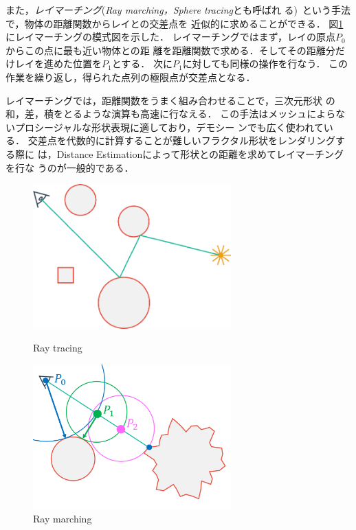 また，\emph{レイマーチング}({\it Ray marching，Sphere tracing}とも呼ばれ
る)~\cite{hart1996sphere}という手法で，物体の距離関数からレイとの交差点を
近似的に求めることができる．
図\ref{fig:raymarch}にレイマーチングの模式図を示した．
レイマーチングではまず，レイの原点$P_0$からこの点に最も近い物体との距
離を距離関数で求める．そしてその距離分だけレイを進めた位置を$P_1$とする．
次に$P_1$に対しても同様の操作を行なう．
この作業を繰り返し，得られた点列の極限点が交差点となる．

レイマーチングでは，距離関数をうまく組み合わせることで，三次元形状
の和，差，積をとるような演算も高速に行なえる．
この手法はメッシュによらないプロシージャルな形状表現に適しており，デモシー
ンでも広く使われている．
交差点を代数的に計算することが難しいフラクタル形状をレンダリングする際に
は，Distance Estimationによって形状との距離を求めてレイマーチングを行な
うのが一般的である．

 \begin{figure}[htbp]
  \begin{minipage}{0.5\hsize}
   \center
   \includegraphics[width=3in, keepaspectratio]{../img/fractal/raytrace.pdf}
   \caption{Ray tracing}
   \label{fig:raytrace}
  \end{minipage}
  \begin{minipage}{0.5\hsize}
   \center
   \includegraphics[width=3in, keepaspectratio]{../img/fractal/raymarching.pdf}
   \caption{Ray marching}
   \label{fig:raymarch}
  \end{minipage}
 \end{figure}


